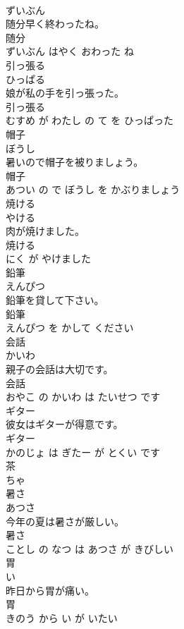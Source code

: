 \documentclass[8pt]{extreport}
\begin{document}
\begin{CJK}{UTF8}{min}
\\	ずいぶん			
\\	随分早く終わったね。	
\\	随分 
\\	ずいぶん はやく おわった ね			
\\	引っ張る	
\\	ひっぱる			
\\	娘が私の手を引っ張った。	
\\	引っ張る 
\\	むすめ が わたし の て を ひっぱった			
\\	帽子	
\\	ぼうし			
\\	暑いので帽子を被りましょう。	
\\	帽子 
\\	あつい の で ぼうし を かぶりましょう			
\\	焼ける	
\\	やける			
\\	肉が焼けました。	
\\	焼ける 
\\	にく が やけました			
\\	鉛筆	
\\	えんぴつ			
\\	鉛筆を貸して下さい。	
\\	鉛筆 
\\	えんぴつ を かして ください			
\\	会話	
\\	かいわ			
\\	親子の会話は大切です。	
\\	会話 
\\	おやこ の かいわ は たいせつ です			
\\	ギター	
\\	彼女はギターが得意です。	
\\	ギター 
\\	かのじょ は ぎたー が とくい です			
\\	茶	
\\	ちゃ			
\\	暑さ	
\\	あつさ			
\\	今年の夏は暑さが厳しい。	
\\	暑さ 
\\	ことし の なつ は あつさ が きびしい			
\\	胃	
\\	い			
\\	昨日から胃が痛い。	
\\	胃 
\\	きのう から い が いたい			

\end{CJK}
\end{document}
